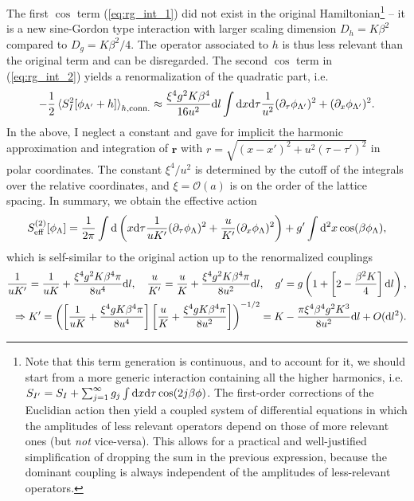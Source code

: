The first $\cos$ term (\cref{eq:rg_int_1}) did not exist in the original Hamiltonian\footnote{
    Note that this term generation is continuous, and to account for it, we should start from a more generic interaction containing all the higher harmonics, i.e. $S_{I'} = S_I + \sum_{j=1}^\infty g_j\int\mathrm d x\mathrm d\tau\cos(2j\beta\phi)$.
    The first-order corrections of the Euclidian action then yield a coupled system of differential equations in which the amplitudes of less relevant operators depend on those of more relevant ones (but {\it not} vice-versa).
    This allows for a practical and well-justified simplification of dropping the sum in the previous expression, because the dominant coupling is always independent of the amplitudes of less-relevant operators.
} -- it is a new sine-Gordon type interaction with larger scaling dimension $D_h = K\beta^2$ compared to $D_g=K\beta^2/4$.
The operator associated to $h$ is thus less relevant than the original term and can be disregarded.
The second $\cos$ term in (\cref{eq:rg_int_2}) yields a renormalization of the quadratic part, i.e.
\begin{align}
    -\frac12\braket{S^2_I[\phi_{\Lambda'}+h]}_{h,{\rm conn.}}
    \approx
    \frac{\xi^4 g^2K\beta^4}{16u^2}\mathrm d l\int\mathrm d x\mathrm d\tau\frac1{u^2}(\partial_
    \tau\phi_{\Lambda'})^2+(\partial_x\phi_{\Lambda'})^2.
    \label{eq:RG_second_order_approximation}
\end{align}
In the above, I neglect a constant and gave for implicit the harmonic approximation and integration of $\bm r$ with $r=\sqrt{(x-x')^2+u^2(\tau-\tau')^2}$ in polar coordinates.
The constant $\xi^4/u^2$ is determined by the cutoff of the integrals over the relative coordinates, and $\xi=\mathcal O(a)$ is on the order of the lattice spacing.
In summary, we obtain the effective action
\begin{align}
    S_{\rm eff}^{(2)}[\phi_\Lambda] = \frac1{2\pi}\int\mathrm d\left(  x\mathrm d\tau\frac{1}{uK'}(\partial_\tau\phi_\Lambda)^2 + \frac{u}{K'}(\partial_x\phi_\Lambda)^2 \right) +  g'\int\mathrm d^2 x\cos(\beta\phi_\Lambda),
\end{align}
which is self-similar to the original action up to the renormalized couplings
\begin{align}
    \frac1{uK'}=\frac1{uK}+\frac{\xi^4 g^2 K\beta^4\pi}{8 u^4}\mathrm d l,
    \quad
    \frac u{K'}=\frac u{K}+\frac{\xi^4 g^2 K\beta^4\pi}{8u^2}\mathrm d l,
    \quad
    g' = g\left( 1 + \left[ 2-\frac{\beta^2 K}4 \right]\mathrm d l \right),
    \\
    \Rightarrow
    K' = \left( \left[ \frac{1}{uK}+\frac{\xi^4 g K\beta^4\pi}{8u^4} \right]\left[ \frac{u}{K}+\frac{\xi^4 g K\beta^4\pi}{8u^2} \right] \right)^{-1/2}
    =
    K-\frac{\pi \xi^4 \beta^4 g^2 K^3}{8u^2}\mathrm d l + O(\mathrm d l^2).
\end{align}
